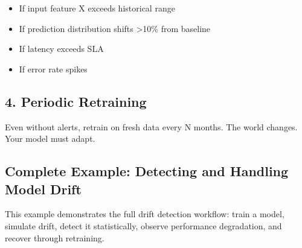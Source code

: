 \documentclass[11pt,oneside]{book}
\begin{document}
\begin{itemize}
\item If input feature X exceeds historical range
\item If prediction distribution shifts >10\% from baseline
\item If latency exceeds SLA
\item If error rate spikes
\end{itemize}

\subsection{4. Periodic Retraining}

Even without alerts, retrain on fresh data every N months. The world changes. Your model must adapt.

\subsection{Complete Example: Detecting and Handling Model Drift}

This example demonstrates the full drift detection workflow: train a model, simulate drift, detect it statistically, observe performance degradation, and recover through retraining.
\end{document}
